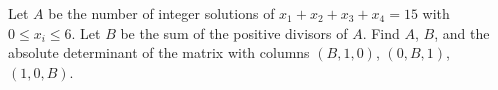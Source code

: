 Let $A$ be the number of integer solutions of $x_1+x_2+x_3+x_4=15$ with $0\le x_i\le6$. Let $B$ be the sum of the positive divisors of $A$. Find $A$, $B$, and the absolute determinant of the matrix with columns $(B,1,0)$, $(0,B,1)$, $(1,0,B)$.
